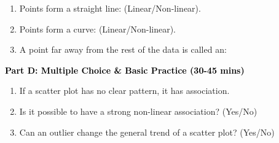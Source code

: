 \documentclass[12pt, letterpaper, fleqn]{article}
\newcommand{\blank}{\underline{\hspace{2.2cm}}}
\begin{document}
\vspace{3mm}

\begin{enumerate}[itemsep=2.5cm, leftmargin=0.6cm, resume]
\item Points form a straight line: \blank (Linear/Non-linear).
\item Points form a curve: \blank (Linear/Non-linear).
\item A point far away from the rest of the data is called an: \blank
\end{enumerate}

\newpage

\begin{tcolorbox}[colback=customteal!20]
\large\textcolor{black}{\textbf{Part D: Multiple Choice \& Basic Practice (30-45 mins)}}
\end{tcolorbox}

\vspace{3mm}

\begin{enumerate}[itemsep=2.5cm, leftmargin=0.6cm, resume]
\item If a scatter plot has no clear pattern, it has \blank association.
\item Is it possible to have a strong non-linear association? (Yes/No) \blank
\item Can an outlier change the general trend of a scatter plot? (Yes/No) \blank
\end{enumerate}
\end{document}
